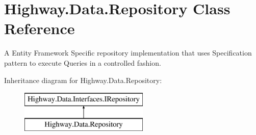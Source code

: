 \hypertarget{class_highway_1_1_data_1_1_repository}{\section{Highway.\-Data.\-Repository Class Reference}
\label{class_highway_1_1_data_1_1_repository}
}


A Entity Framework Specific repository implementation that uses Specification pattern to execute Queries in a controlled fashion.  


Inheritance diagram for Highway.\-Data.\-Repository\-:\begin{figure}[H]
\begin{center}
\leavevmode
\includegraphics[height=2.000000cm]{class_highway_1_1_data_1_1_repository}
\end{center}
\end{figure}
